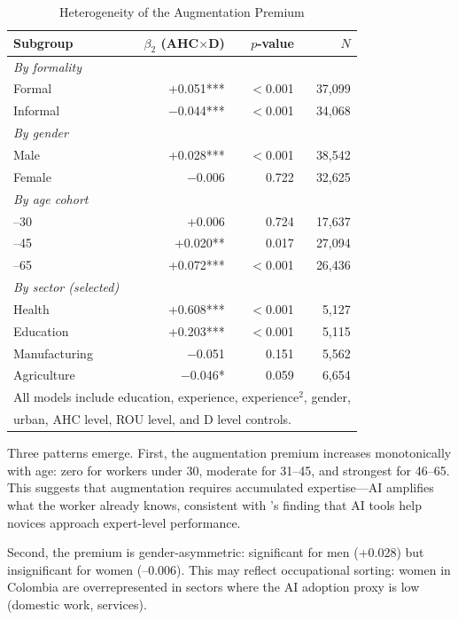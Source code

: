 \documentclass[a4paper,fleqn]{cas-dc}
\begin{document}
\begin{table}[width=.9\linewidth,cols=4,pos=h]
\caption{Heterogeneity of the Augmentation Premium}\label{tab:heterogeneity}
\begin{tabular*}{\tblwidth}{@{} lrrr @{}}
\toprule
Subgroup & $\beta_2$ (AHC$\times$D) & $p$-value & $N$ \\
\midrule
\multicolumn{4}{l}{\textit{By formality}} \\
\quad Formal & +0.051*** & $<$0.001 & 37,099 \\
\quad Informal & $-$0.044*** & $<$0.001 & 34,068 \\[3pt]
\multicolumn{4}{l}{\textit{By gender}} \\
\quad Male & +0.028*** & $<$0.001 & 38,542 \\
\quad Female & $-$0.006 & 0.722 & 32,625 \\[3pt]
\multicolumn{4}{l}{\textit{By age cohort}} \\
\quad 18--30 & +0.006 & 0.724 & 17,637 \\
\quad 31--45 & +0.020** & 0.017 & 27,094 \\
\quad 46--65 & +0.072*** & $<$0.001 & 26,436 \\[3pt]
\multicolumn{4}{l}{\textit{By sector (selected)}} \\
\quad Health & +0.608*** & $<$0.001 & 5,127 \\
\quad Education & +0.203*** & $<$0.001 & 5,115 \\
\quad Manufacturing & $-$0.051 & 0.151 & 5,562 \\
\quad Agriculture & $-$0.046* & 0.059 & 6,654 \\
\bottomrule
\multicolumn{4}{l}{\footnotesize All models include education, experience, experience$^2$, gender,}\\
\multicolumn{4}{l}{\footnotesize urban, AHC level, ROU level, and D level controls.}
\end{tabular*}
\end{table}

Three patterns emerge. First, the augmentation premium increases monotonically with age: zero for workers under 30, moderate for 31--45, and strongest for 46--65. This suggests that augmentation requires accumulated expertise---AI amplifies what the worker already knows, consistent with \citet{brynjolfsson2025generative}'s finding that AI tools help novices approach expert-level performance.

Second, the premium is gender-asymmetric: significant for men (+0.028) but insignificant for women (--0.006). This may reflect occupational sorting: women in Colombia are overrepresented in sectors where the AI adoption proxy is low (domestic work, services).
\end{document}
